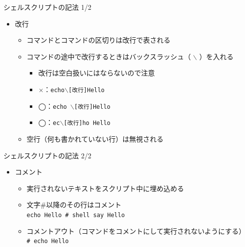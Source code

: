 \documentclass[12pt,aspectratio=169]{beamer}
\begin{document}
\begin{frame}{シェルスクリプトの記法 1/2}
  \begin{itemize}
    \item 改行
      \begin{itemize}
        \item コマンドとコマンドの区切りは改行で表される
        \item コマンドの途中で改行するときはバックスラッシュ（ $\backslash$ ）を入れる
          \begin{itemize}
            \item 改行は空白扱いにはならないので注意
            \item ×：\texttt{echo$\backslash$[改行]Hello}
            \item ◯：\texttt{echo $\backslash$[改行]Hello}
            \item ◯：\texttt{ec$\backslash$[改行]ho Hello}
          \end{itemize}

        \item 空行（何も書かれていない行）は無視される
      \end{itemize}

  \end{itemize}

\end{frame}


\begin{frame}{シェルスクリプトの記法 2/2}
  \begin{itemize}
    \item コメント
      \begin{itemize}
        \item 実行されないテキストをスクリプト中に埋め込める
        \item 文字\#以降のその行はコメント\\
          \texttt{echo Hello \# shell say Hello }
        \item コメントアウト（コマンドをコメントにして実行されないようにする）\\
          \texttt{\# echo Hello }
      \end{itemize}

  \end{itemize}

\end{frame}
\end{document}
